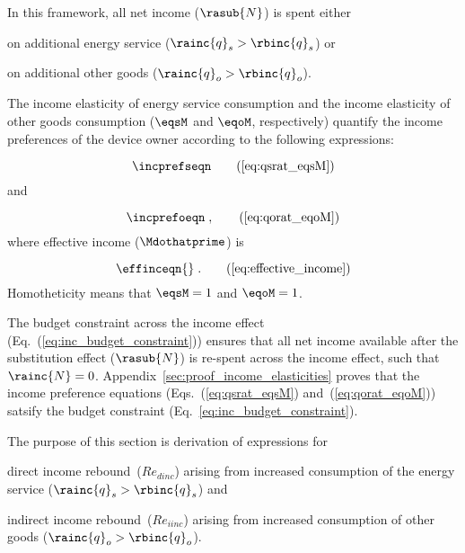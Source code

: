 In this framework, all net income ($\rasub{N}$) is spent either 
%
\begin{enumerate*}[label={(\alph*)}]
	
  \item on additional energy service ($\rainc{q}_s > \rbinc{q}_s$) or
  
  \item on additional other goods ($\rainc{q}_o > \rbinc{q}_o$).
    
\end{enumerate*}
%
The income elasticity of energy service consumption and 
the income elasticity of other goods consumption 
($\eqsM$ and $\eqoM$, respectively)
quantify the income preferences of the device owner according to the following expressions:

\begin{equation}
  \incprefseqn \tag{\ref{eq:qsrat_eqsM}}
\end{equation}
%
and

\begin{equation}
  \incprefoeqn \; , \tag{\ref{eq:qorat_eqoM}}
\end{equation}
%
where effective income ($\Mdothatprime$) is

\begin{equation}
  \effinceqn{} \; . \tag{\ref{eq:effective_income}}
\end{equation}
%
Homotheticity means that $\eqsM = 1$ and $\eqoM = 1$.

The budget constraint across the income effect (Eq.~(\ref{eq:inc_budget_constraint})) 
ensures that all net income available after the substitution effect ($\rasub{N}$) 
is re-spent across the income effect, 
such that $\rainc{N} = 0$.
Appendix~\ref{sec:proof_income_elasticities} proves that
the income preference equations (Eqs.~(\ref{eq:qsrat_eqsM}) and~(\ref{eq:qorat_eqoM})) 
satsify the budget constraint (Eq.~\ref{eq:inc_budget_constraint}).

The purpose of this section is derivation of expressions for 
%
\begin{enumerate*}[label={(\alph*)}]
	
  \item direct income rebound~($Re_{dinc}$) 
        arising from increased consumption of the energy service 
        ($\rainc{q}_s > \rbinc{q}_s$) and
  
  \item indirect income rebound~($Re_{iinc}$) 
        arising from increased consumption of other goods 
        ($\rainc{q}_o > \rbinc{q}_o$).
    
\end{enumerate*}


